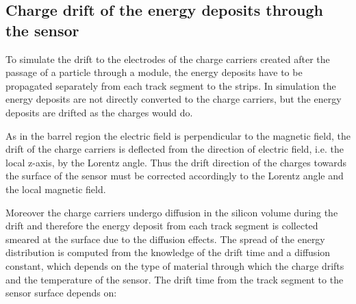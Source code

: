 


\subsection{Charge drift of the energy deposits through the sensor~\label{sec:drift}}

To simulate  the drift to the electrodes of the charge carriers created after the passage of a particle through a module, the energy deposits have to be propagated separately from each track segment to the strips. In simulation the energy deposits are not directly converted to the charge carriers, but the energy deposits are drifted as the charges would do. 

As in the barrel region the electric field is perpendicular to the magnetic field, the drift of the charge carriers is deflected from the direction of electric field, i.e. the local z-axis, by the Lorentz angle. Thus the drift direction of the charges towards the surface of the sensor must be corrected accordingly to the Lorentz angle and the local magnetic field. 

Moreover the charge carriers undergo diffusion in the silicon volume during the drift and therefore the energy deposit from each track segment is collected smeared at the surface due to the diffusion effects. The spread of the energy distribution is computed from the knowledge of the drift time and a diffusion constant, which depends on the type of material through which the charge drifts and the temperature of the sensor. The drift time from the track segment to the sensor surface depends on:

